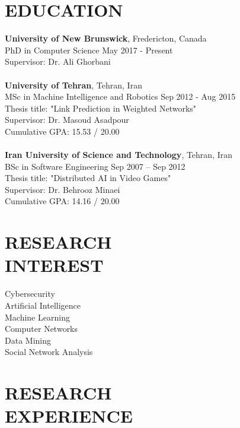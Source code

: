 \documentclass[margin, 10pt]{res} %
\begin{document}
\begin{resume}

\section{EDUCATION}

\textbf{University of New Brunswick}, Fredericton, Canada \\
PhD in Computer Science \hfill May 2017 - Present \\
Supervisor: Dr. Ali Ghorbani \\
\\
\textbf{University of Tehran}, Tehran, Iran \\
MSc  in Machine Intelligence and Robotics \hfill Sep 2012 - Aug 2015 \\
Thesis title: "Link Prediction in Weighted Networks" \\
Supervisor: Dr. Masoud Asadpour \\
Cumulative GPA: 15.53 / 20.00 \\
\\
\textbf{Iran University of Science and Technology}, Tehran, Iran \\
BSc in Software Engineering \hfill Sep 2007 – Sep 2012 \\
Thesis title: "Distributed AI in Video Games" \\
Supervisor: Dr. Behrooz Minaei \\
Cumulative GPA: 14.16 / 20.00


\section{RESEARCH \\ INTEREST}

Cybersecurity \\
Artificial Intelligence \\
Machine Learning \\
Computer Networks \\
Data Mining \\
Social Network Analysis \\


\section{RESEARCH \\ EXPERIENCE}


\end{resume}
\end{document}

